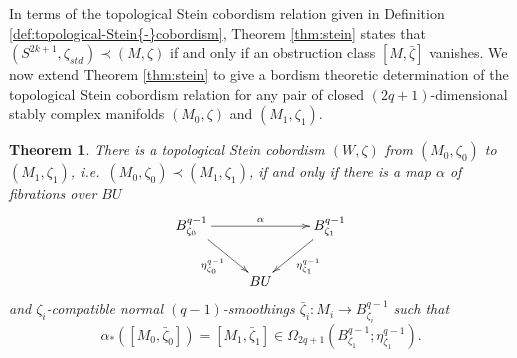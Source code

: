 \documentclass[12pt]{amsart}
\newcommand\scxs{\zeta}					%
\newcommand\bscxs{\bar \zeta}			%
\newtheorem{Theorem}{Theorem}[section]
\theoremstyle{remark}
\begin{document}
In terms of the topological Stein cobordism relation given in Definition 
\ref{def:topological-Stein{-}cobordism},
Theorem \ref{thm:stein} states that $(S^{2k{+}1}, \scxs_{std}) \prec (M, \scxs)$ if and only if an obstruction class $[M, \bscxs]$ vanishes.  
We now extend Theorem \ref{thm:stein} to give a bordism theoretic determination of the topological Stein cobordism relation for any pair of closed $(2q{+}1)$-dimensional stably complex manifolds $(M_0, \scxs)$ and $(M_1, \scxs_1)$.

\begin{Theorem} \label{thm:surgery_theorem_alternative}
There is a topological Stein cobordism $(W, \zeta)$ from $(M_0, \zeta_0)$ to $(M_1, \zeta_1)$, i.e.~$(M_0, \zeta_0) \prec (M_1, \zeta_1)$,
if and only if there is a map $\alpha$ of fibrations over $BU$ 
%
\[ \xymatrix{ B^{q{-}1}_{\zeta_0} \ar[dr]_{\eta^{q{-}1}_{\zeta_0}} \ar[rr]^{\alpha} && 
B^{q{-}1}_{\zeta_1} \ar[dl]^{\eta^{q{-}1}_{\zeta_1}} \\ & BU } \]
%
and $\zeta_i$-compatible normal $(q{-}1)$-smoothings $ \bar \zeta_i \colon M_i \to B^{q{-}1}_{\zeta_i}$ 
such that
%
\[ \alpha_*([M_0, \bar \zeta_0]) = [M_1, \bar \zeta_1] \in 
\Omega_{2q{+}1}(B^{q{-}1}_{\zeta_1}; \eta^{q{-}1}_{\zeta_1}). \]
%
\end{Theorem}
\end{document}
